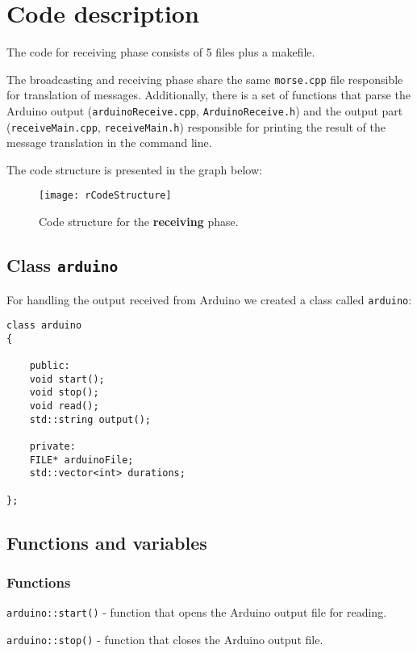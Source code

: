 \documentclass[12pt]{report}
\begin{document}
\section{Code description}

The code for receiving phase consists of 5 files plus a makefile. 

The broadcasting and receiving phase share the same \verb|morse.cpp| file responsible for translation of messages. Additionally, there is a set of functions that parse the Arduino output (\verb|arduinoReceive.cpp|, \verb|ArduinoReceive.h|) and the output part (\verb|receiveMain.cpp|, \verb|receiveMain.h|) responsible for printing the result of the message translation in the command line.

The code structure is presented in the graph below:

\begin{figure}[H]
\centering\texttt{[image: rCodeStructure]}
\caption{Code structure for the \textbf{receiving} phase.}	
\label{fig:re_code}
\end{figure}

\newpage

\subsection{Class \texttt{arduino}}

For handling the output received from Arduino we created a class called \verb|arduino|:

\begin{lstlisting}
class arduino
{

	public:
	void start();
	void stop();
	void read();
	std::string output();

	private:
	FILE* arduinoFile;
	std::vector<int> durations;
	
};
\end{lstlisting}

\subsection{Functions and variables}

\subsubsection{Functions}

\verb|arduino::start()| - function that opens the Arduino output file for reading.

\verb|arduino::stop()| - function that closes the Arduino output file.
\end{document}
